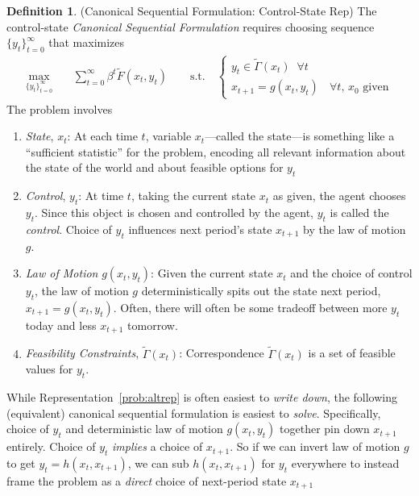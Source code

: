\documentclass[12pt]{article}
\numberwithin{equation}{section} %
\theoremstyle{plain}
\theoremstyle{definition}
\newtheorem{defn}[thm]{Definition}
\theoremstyle{remark}
\newcommand{\sumtinfz}{\sum^\infty_{t=0}}
\begin{document}
\begin{defn}{(Canonical Sequential Formulation: Control-State Rep)}
\label{defn:sequential-altrep}
The control-state \emph{Canonical Sequential Formulation} requires
choosing sequence $\{y_{t}\}_{t=0}^\infty$ that maximizes
\begin{align}
  \label{prob:altrep}
  \max_{\{y_t\}_{t=0}^\infty}
  \quad &\sumtinfz \beta^t \tilde{F}(x_t,y_t)
  \qquad \text{s.t.}\quad
  \begin{cases}
  y_t \in \tilde{\Gamma}(x_t) \;\; \forall t\\
  \text{$x_{t+1} = g(x_t,y_t)$ $\;\forall t$, $x_0$ given}
  \end{cases}
\end{align}
The problem involves
\begin{enumerate}
  \item \emph{State}, $x_t$: At each time $t$, variable
    $x_t$---called the state---is something like a ``sufficient
    statistic'' for the problem, encoding all relevant information about
    the state of the world and about feasible options for $y_t$
  \item \emph{Control}, $y_{t}$: At time $t$, taking the current state
    $x_t$ as given, the agent chooses $y_{t}$.
    Since this object is chosen and controlled by the agent, $y_{t}$ is
    called the \emph{control}.
    Choice of $y_t$ influences next period's state $x_{t+1}$ by the law
    of motion $g$.
  \item \emph{Law of Motion} $g(x_t,y_t)$: Given the current state $x_t$
    and the choice of control $y_t$, the law of motion $g$
    deterministically spits out the state next period,
    $x_{t+1}=g(x_t,y_t)$.  Often, there will often be some tradeoff
    between more $y_t$ today and less $x_{t+1}$ tomorrow.

  \item \emph{Feasibility Constraints}, $\tilde{\Gamma}(x_t)$:
    Correspondence $\tilde{\Gamma}(x_t)$ is a set of feasible values
    for $y_{t}$.
\end{enumerate}
While Representation~\ref{prob:altrep} is often easiest to
\emph{write down}, the following (equivalent) canonical sequential
formulation is easiest to \emph{solve}.
Specifically, choice of $y_t$ and deterministic law of motion
$g(x_t,y_t)$ together pin down $x_{t+1}$ entirely.
Choice of $y_t$ \emph{implies} a choice of $x_{t+1}$.  So if we can
invert law of motion $g$ to get $y_t=h(x_t,x_{t+1})$, we can sub
$h(x_t,x_{t+1})$ for $y_t$ everywhere to instead frame the problem as
a \emph{direct} choice of next-period state $x_{t+1}$
\end{defn}
\end{document}
